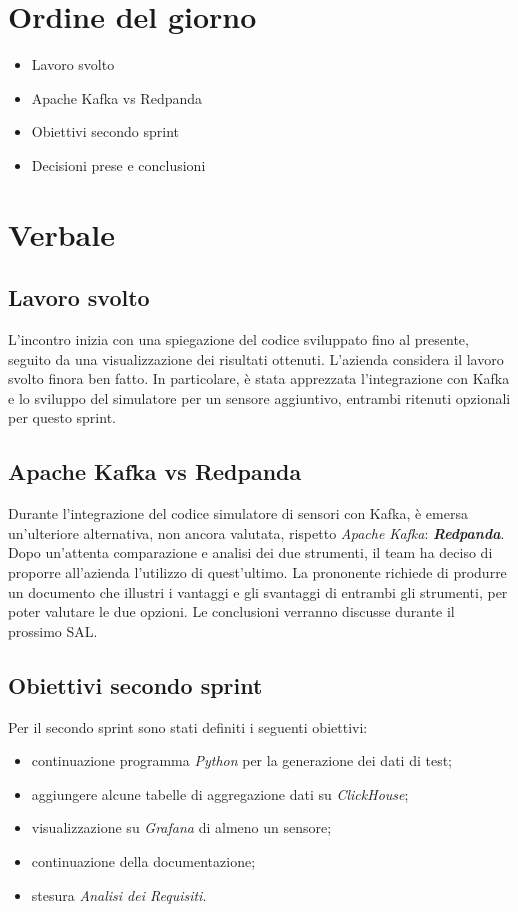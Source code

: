 \documentclass[italian,12pt]{article}
\begin{document}
\section{Ordine del giorno}
\begin{itemize}
	\item Lavoro svolto
	\item Apache Kafka vs Redpanda
	\item Obiettivi secondo sprint
	\item Decisioni prese e conclusioni
\end{itemize}
\newpage
\section{Verbale}
\subsection{Lavoro svolto}
L'incontro inizia con una spiegazione del codice sviluppato fino al presente, seguito da una visualizzazione dei risultati ottenuti.
L'azienda considera il lavoro svolto finora ben fatto. In particolare, è stata apprezzata l'integrazione con Kafka e lo sviluppo del simulatore per un sensore aggiuntivo, entrambi ritenuti opzionali per questo sprint.
\subsection{Apache Kafka vs Redpanda}
Durante l'integrazione del codice simulatore di sensori con Kafka, è emersa un'ulteriore alternativa, non ancora valutata, rispetto \textit{Apache Kafka}: \textbf{\textit{Redpanda}}. Dopo un'attenta comparazione e analisi dei due strumenti, il team ha deciso di proporre all'azienda l'utilizzo di quest'ultimo. La prononente richiede di produrre un documento che illustri i vantaggi e gli svantaggi di entrambi gli strumenti, per poter valutare le due opzioni. Le conclusioni verranno discusse durante il prossimo SAL. 
\subsection{Obiettivi secondo sprint}
Per il secondo sprint sono stati definiti i seguenti obiettivi:
\begin{itemize}
	\item continuazione programma \textit{Python} per la generazione dei dati di test;
	\item aggiungere alcune tabelle di aggregazione dati su \textit{ClickHouse};
	\item visualizzazione su \textit{Grafana} di almeno un sensore;
	\item continuazione della documentazione;
	\item stesura \textit{Analisi dei Requisiti}.
\end{itemize}
\newpage
\end{document}
